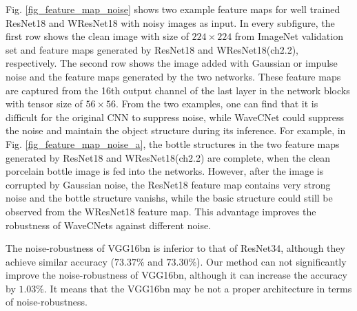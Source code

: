 \documentclass[10pt,twocolumn,letterpaper]{article}
\begin{document}
Fig. \ref{fig_feature_map_noise} shows two example feature maps for well trained ResNet18 and WResNet18
with noisy images as input.
In every subfigure, the first row shows the clean image with size of $224\times224$ from ImageNet validation set
and feature maps generated by ResNet18 and WResNet18(ch2.2), respectively.
The second row shows the image added with Gaussian or impulse noise and the feature maps generated by the two networks.
These feature maps are captured from the 16th output channel of the last layer in the network blocks with tensor size of $56\times56$.
From the two examples, one can find that it is difficult for the original CNN to suppress noise,
while WaveCNet could suppress the noise and maintain the object structure during its inference.
For example, in Fig. \ref{fig_feature_map_noise_a},
the bottle structures in the two feature maps generated by ResNet18 and WResNet18(ch2.2) are complete,
when the clean porcelain bottle image is fed into the networks.
However, after the image is corrupted by Gaussian noise,
the ResNet18 feature map contains very strong noise and the bottle structure vanishs,
while the basic structure could still be observed from the WResNet18 feature map.
This advantage improves the robustness of WaveCNets against different noise.

The noise-robustness of VGG16bn is inferior to that of ResNet34,
although they achieve similar accuracy ($73.37\%$ and $73.30\%$).
Our method can not significantly improve the noise-robustness of VGG16bn,
although it can increase the accuracy by $1.03\%$.
It means that the VGG16bn may be not a proper architecture in terms of noise-robustness.
\end{document}
